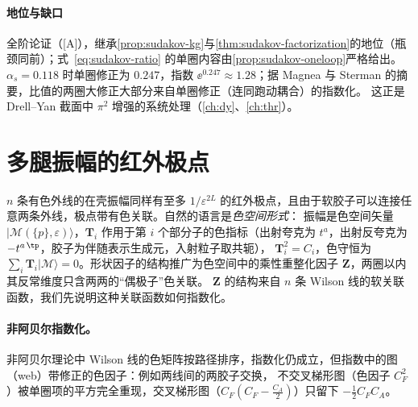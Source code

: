 \paragraph{地位与缺口}全阶论证（[A]），继承\cref{prop:sudakov-kg}与\cref{thm:sudakov-factorization}的地位（瓶颈同前）；式~\eqref{eq:sudakov-ratio} 的单圈内容由\cref{prop:sudakov-oneloop}严格给出。
$\alpha_s=0.118$ 时单圈修正为 $0.247$，指数 $\ee^{0.247}\approx1.28$；据 Magnea 与 Sterman 的摘要，比值的两圈大修正大部分来自单圈修正（连同跑动耦合）的指数化\cite{Magnea:1990zb}。
这正是 Drell--Yan 截面中 $\pi^2$ 增强的系统处理（\cref{ch:dy}、\cref{ch:thr}）。
\section{多腿振幅的红外极点}\label{sec:sudakov-multileg}

$n$ 条有色外线的在壳振幅同样有至多 $1/\varepsilon^{2L}$ 的红外极点，且由于软胶子可以连接任意两条外线，极点带有色关联。自然的语言是\emph{色空间形式}：
振幅是色空间矢量 $|\mathcal M(\{p\},\varepsilon)\rangle$，$\mathbf T_i$ 作用于第 $i$ 个部分子的色指标（出射夸克为 $t^a$，出射反夸克为 $-t^{a\,\tp}$，胶子为伴随表示生成元，入射粒子取共轭），
$\mathbf T_i^2=C_i$，色守恒为 $\sum_i\mathbf T_i|\mathcal M\rangle=0$。形状因子的结构推广为色空间中的乘性重整化因子 $\mathbf Z$，两圈以内其反常维度只含两两的“偶极子”色关联。
$\mathbf Z$ 的结构来自 $n$ 条 Wilson 线的软关联函数，我们先说明这种关联函数如何指数化。

\paragraph{非阿贝尔指数化。}非阿贝尔理论中 Wilson 线的色矩阵按路径排序，指数化仍成立，但指数中的图（web）带修正的色因子：例如两线间的两胶子交换，
不交叉梯形图（色因子 $C_F^2$）被单圈项的平方完全重现，交叉梯形图（$C_F(C_F-\frac{C_A}2)$）只留下 $-\frac12C_FC_A$。%

